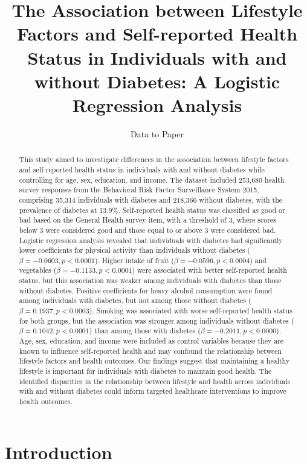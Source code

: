 \documentclass[12pt]{article}
\title{The Association between Lifestyle Factors and Self-reported Health Status in Individuals with and without Diabetes: A Logistic Regression Analysis}
\author{Data to Paper}
\begin{document}
\maketitle

\begin{abstract}
This study aimed to investigate differences in the association between lifestyle factors and self-reported health status in individuals with and without diabetes while controlling for age, sex, education, and income. The dataset included 253,680 health survey responses from the Behavioral Risk Factor Surveillance System 2015, comprising 35,314 individuals with diabetes and 218,366 without diabetes, with the prevalence of diabetes at 13.9\%. Self-reported health status was classified as good or bad based on the General Health survey item, with a threshold of 3, where scores below 3 were considered good and those equal to or above 3 were considered bad. Logistic regression analysis revealed that individuals with diabetes had significantly lower coefficients for physical activity than individuals without diabetes (\(\beta=-0.0603, p < 0.0001\)). Higher intake of fruit (\(\beta=-0.0596, p < 0.0004\)) and vegetables (\(\beta=-0.1133, p < 0.0001\)) were associated with better self-reported health status, but this association was weaker among individuals with diabetes than those without diabetes. Positive coefficients for heavy alcohol consumption were found among individuals with diabetes, but not among those without diabetes (\(\beta=0.1937, p < 0.0003\)). Smoking was associated with worse self-reported health status for both groups, but the association was stronger among individuals without diabetes (\(\beta=0.1042, p < 0.0001\)) than among those with diabetes (\(\beta=-0.2011, p < 0.0000\)). Age, sex, education, and income were included as control variables because they are known to influence self-reported health and may confound the relationship between lifestyle factors and health outcomes. Our findings suggest that maintaining a healthy lifestyle is important for individuals with diabetes to maintain good health. The identified disparities in the relationship between lifestyle and health across individuals with and without diabetes could inform targeted healthcare interventions to improve health outcomes.
\end{abstract}

\section{Introduction}
\end{document}
